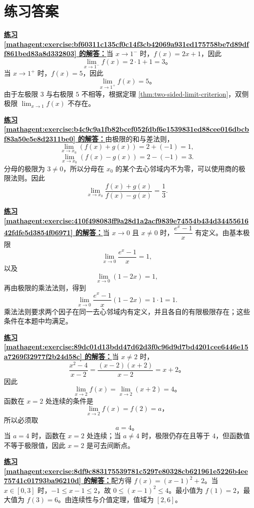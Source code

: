 \documentclass[UTF8,fontset=fandol,11pt]{ctexart}
\begin{document}
\section*{练习答案}
\par\noindent\textbf{\hyperref[mathagent:exercise:bf60311c135cf0c14f3cb42069a931ed175758be7d89dff861bed83a8d332803]{练习 \ref*{mathagent:exercise:bf60311c135cf0c14f3cb42069a931ed175758be7d89dff861bed83a8d332803} 的解答：}}当 $x\to1^-$ 时，$f(x)=2x+1$，因此
\[
\lim_{x\to1^-}f(x)=2\cdot1+1=3\text{。}
\]
当 $x\to1^+$ 时，$f(x)=5$，因此
\[
\lim_{x\to1^+}f(x)=5\text{。}
\]
由于左极限 $3$ 与右极限 $5$ 不相等，根据定理 \ref{thm:two-sided-limit-criterion}，双侧极限 $\lim_{x\to1}f(x)$ 不存在。\par
\par\noindent\textbf{\hyperref[mathagent:exercise:b4c9c9a1fb82bcef052fdbf6e1539831ed88cee016dbcbf83a50e5e8d2311be0]{练习 \ref*{mathagent:exercise:b4c9c9a1fb82bcef052fdbf6e1539831ed88cee016dbcbf83a50e5e8d2311be0} 的解答：}}由极限的和与差法则，
\[
\lim_{x\to x_0}(f(x)+g(x))=2+(-1)=1,
\]
\[
\lim_{x\to x_0}(f(x)-g(x))=2-(-1)=3.
\]
分母的极限为 $3\neq0$，所以分母在 $x_0$ 的某个去心邻域内不为零，可以使用商的极限法则。因此
\[
\lim_{x\to x_0}\frac{f(x)+g(x)}{f(x)-g(x)}=\frac{1}{3}.
\]\par
\par\noindent\textbf{\hyperref[mathagent:exercise:410f498083ff9a28d1a2acf9839e74554b434d3445561642fdfe5d3854f06971]{练习 \ref*{mathagent:exercise:410f498083ff9a28d1a2acf9839e74554b434d3445561642fdfe5d3854f06971} 的解答：}}当 $x\to0$ 且 $x\neq0$ 时，$\dfrac{e^x-1}{x}$ 有定义。由基本极限
\[
\lim_{x\to0}\frac{e^x-1}{x}=1,
\]
以及
\[
\lim_{x\to0}(1-2x)=1,
\]
再由极限的乘法法则，得到
\[
\lim_{x\to0}\frac{e^x-1}{x}(1-2x)=1\cdot1=1.
\]
乘法法则要求两个因子在同一去心邻域内有定义，并且各自的有限极限存在；这些条件在本题中均满足。\par
\par\noindent\textbf{\hyperref[mathagent:exercise:89dc01d13bdd47d62d3f0c96d9d7bd4201cee6446e15a7269f32977f2b24d58c]{练习 \ref*{mathagent:exercise:89dc01d13bdd47d62d3f0c96d9d7bd4201cee6446e15a7269f32977f2b24d58c} 的解答：}}当 $x\neq2$ 时，
\[
\frac{x^2-4}{x-2}=\frac{(x-2)(x+2)}{x-2}=x+2\text{。}
\]
因此
\[
\lim_{x\to2}f(x)=\lim_{x\to2}(x+2)=4\text{。}
\]
函数在 $x=2$ 处连续的条件是
\[
\lim_{x\to2}f(x)=f(2)=a\text{，}
\]
所以必须取
\[
a=4\text{。}
\]
当 $a=4$ 时，函数在 $x=2$ 处连续；当 $a\neq4$ 时，极限仍存在且等于 $4$，但函数值不等于极限值，因此 $x=2$ 是可去间断点。\par
\par\noindent\textbf{\hyperref[mathagent:exercise:8df9c883175539781c5297e80328cb621961e5226b4ee75741c01793ba96210d]{练习 \ref*{mathagent:exercise:8df9c883175539781c5297e80328cb621961e5226b4ee75741c01793ba96210d} 的解答：}}配方得 $f(x)=(x-1)^2+2$。当 $x\in[0,3]$ 时，$-1\leq x-1\leq2$，故 $0\leq(x-1)^2\leq4$。最小值为 $f(1)=2$，最大值为 $f(3)=6$。由连续性与介值定理，值域为 $[2,6]$。
\end{document}
